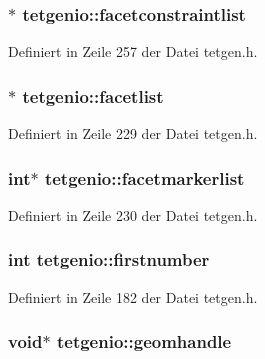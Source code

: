 \hypertarget{classtetgenio_aabfef9df7956218bcb98ee39f1a9814b}{
\subsubsection[{facetconstraintlist}]{$\ast$ tetgenio\-::facetconstraintlist}}\label{classtetgenio_aabfef9df7956218bcb98ee39f1a9814b}


Definiert in Zeile 257 der Datei tetgen.\-h.

\hypertarget{classtetgenio_ad65489b9aece6ba14ff8e3c89f533ced}{
\subsubsection[{facetlist}]{$\ast$ tetgenio\-::facetlist}}\label{classtetgenio_ad65489b9aece6ba14ff8e3c89f533ced}


Definiert in Zeile 229 der Datei tetgen.\-h.

\hypertarget{classtetgenio_a0d5d9d0718980f8e9d4ecc3e771abba0}{
\subsubsection[{facetmarkerlist}]{\setlength{\rightskip}{0pt plus 5cm}int$\ast$ tetgenio\-::facetmarkerlist}}\label{classtetgenio_a0d5d9d0718980f8e9d4ecc3e771abba0}


Definiert in Zeile 230 der Datei tetgen.\-h.

\hypertarget{classtetgenio_ace3ae3f90741f8e51e02f5007d81e440}{
\subsubsection[{firstnumber}]{\setlength{\rightskip}{0pt plus 5cm}int tetgenio\-::firstnumber}}\label{classtetgenio_ace3ae3f90741f8e51e02f5007d81e440}


Definiert in Zeile 182 der Datei tetgen.\-h.

\hypertarget{classtetgenio_a7d3bb20b8973217ce08614dabb3b7d2a}{
\subsubsection[{geomhandle}]{\setlength{\rightskip}{0pt plus 5cm}void$\ast$ tetgenio\-::geomhandle}}\label{classtetgenio_a7d3bb20b8973217ce08614dabb3b7d2a}


